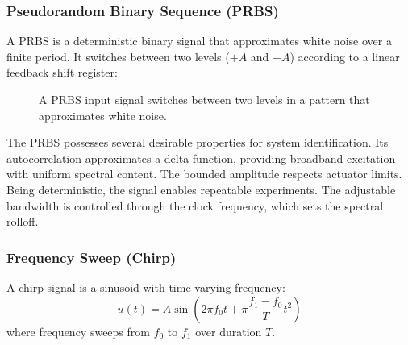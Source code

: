 \subsubsection{Pseudorandom Binary Sequence (PRBS)}

A PRBS is a deterministic binary signal that approximates white noise over a finite period. It switches between two levels ($+A$ and $-A$) according to a linear feedback shift register:

\begin{figure}[htbp]
\centering
{}
\caption{A PRBS input signal switches between two levels in a pattern that approximates white noise.}
\label{fig:prbs}
\end{figure}

The PRBS possesses several desirable properties for system identification. Its autocorrelation approximates a delta function, providing broadband excitation with uniform spectral content. The bounded amplitude respects actuator limits. Being deterministic, the signal enables repeatable experiments. The adjustable bandwidth is controlled through the clock frequency, which sets the spectral rolloff.

\subsubsection{Frequency Sweep (Chirp)}

A chirp signal is a sinusoid with time-varying frequency:
\begin{equation}
u(t) = A \sin\left(2\pi f_0 t + \pi \frac{f_1 - f_0}{T} t^2\right)
\label{eq:chirp}
\end{equation}
where frequency sweeps from $f_0$ to $f_1$ over duration $T$.


